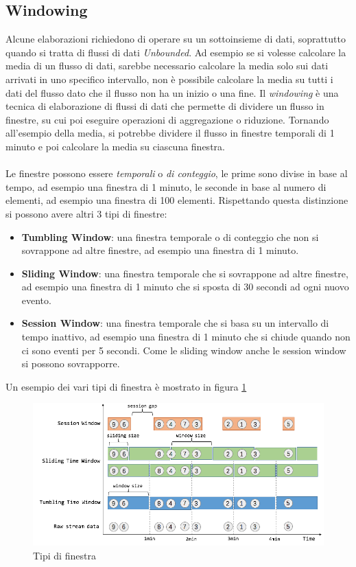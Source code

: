 \subsection{Windowing}
\label{subsec:flink_windowing}
Alcune elaborazioni richiedono di operare su un sottoinsieme di dati, soprattutto quando si tratta di flussi di dati \textit{Unbounded}.
Ad esempio se si volesse calcolare la media di un flusso di dati, sarebbe necessario calcolare la media solo sui dati arrivati in uno specifico intervallo, 
non è possibile calcolare la media su tutti i dati del flusso dato che il flusso non ha un inizio o una fine.
Il \textit{windowing} è una tecnica di elaborazione di flussi di dati che permette di dividere un flusso in finestre,
su cui poi eseguire operazioni di aggregazione o riduzione.
Tornando all'esempio della media, si potrebbe dividere il flusso in finestre temporali di 1 minuto e poi calcolare la media su ciascuna finestra.\\\\
Le finestre possono essere \textit{temporali} o \textit{di conteggio}, le prime sono divise in base al tempo, ad esempio una finestra di 1 minuto,
le seconde in base al numero di elementi, ad esempio una finestra di 100 elementi.
Rispettando questa distinzione si possono avere altri 3 tipi di finestre:
\begin{itemize}
    \item \textbf{Tumbling Window}: una finestra temporale o di conteggio che non si sovrappone ad altre finestre, ad esempio una finestra di 1 minuto.
    \item \textbf{Sliding Window}: una finestra temporale che si sovrappone ad altre finestre, ad esempio una finestra di 1 minuto che si sposta di 30 secondi ad ogni nuovo evento.
    \item \textbf{Session Window}: una finestra temporale che si basa su un intervallo di tempo inattivo, ad esempio una finestra di 1 minuto che si chiude quando non ci sono eventi per 5 secondi.
    Come le sliding window anche le session window si possono sovrapporre.
\end{itemize}
Un esempio dei vari tipi di finestra è mostrato in figura \ref{fig:flink_window}

\begin{figure}[htbp]
    \centering
    \includegraphics[width=\textwidth]{images/flink/windows.png}
    \caption{Tipi di finestra}
    \label{fig:flink_window}
\end{figure}

